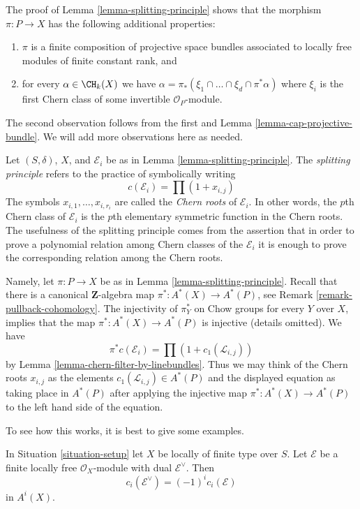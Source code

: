 \begin{remark}
\label{remark-the-proof-shows-more}
The proof of Lemma \ref{lemma-splitting-principle}
shows that the morphism $\pi : P \to X$ has the following additional
properties:
\begin{enumerate}
\item $\pi$ is a finite composition of projective space bundles
associated to locally free modules of finite constant rank, and
\item for every $\alpha \in \CH_k(X)$ we have
$\alpha = \pi_*(\xi_1 \cap \ldots \cap \xi_d \cap \pi^*\alpha)$
where $\xi_i$ is the first Chern class of some invertible
$\mathcal{O}_P$-module.
\end{enumerate}
The second observation follows from the first and
Lemma \ref{lemma-cap-projective-bundle}.
We will add more observations here as needed.
\end{remark}

\noindent
Let $(S, \delta)$, $X$, and $\mathcal{E}_i$ be as in
Lemma \ref{lemma-splitting-principle}.
The {\it splitting principle} refers to the practice of symbolically writing
$$
c(\mathcal{E}_i) = \prod (1 + x_{i, j})
$$
The symbols $x_{i, 1}, \ldots, x_{i, r_i}$ are called the {\it Chern roots}
of $\mathcal{E}_i$. In other words, the $p$th Chern class of $\mathcal{E}_i$
is the $p$th elementary symmetric function in the Chern roots.
The usefulness of the splitting principle comes from the assertion that
in order to prove a polynomial relation among Chern classes of the
$\mathcal{E}_i$ it is enough to prove the corresponding relation among the
Chern roots.

\medskip\noindent
Namely, let $\pi : P \to X$ be as in Lemma \ref{lemma-splitting-principle}.
Recall that there is a canonical $\mathbf{Z}$-algebra map
$\pi^* : A^*(X) \to A^*(P)$, see
Remark \ref{remark-pullback-cohomology}. The injectivity of $\pi_Y^*$
on Chow groups for every $Y$ over $X$, implies that the map
$\pi^* : A^*(X) \to A^*(P)$ is injective (details omitted).
We have
$$
\pi^*c(\mathcal{E}_i) = \prod (1 + c_1(\mathcal{L}_{i, j}))
$$
by Lemma \ref{lemma-chern-filter-by-linebundles}. Thus we may think of the
Chern roots $x_{i, j}$ as the elements $c_1(\mathcal{L}_{i, j}) \in A^*(P)$
and the displayed equation as taking place in $A^*(P)$ after
applying the injective map $\pi^* : A^*(X) \to A^*(P)$ to the left
hand side of the equation.

\medskip\noindent
To see how this works, it is best to give some examples.

\begin{lemma}
\label{lemma-chern-classes-dual}
In Situation \ref{situation-setup} let $X$ be locally of finite type over $S$.
Let $\mathcal{E}$ be a finite locally free $\mathcal{O}_X$-module
with dual $\mathcal{E}^\vee$. Then
$$
c_i(\mathcal{E}^\vee) = (-1)^i c_i(\mathcal{E})
$$
in $A^i(X)$.
\end{lemma}

